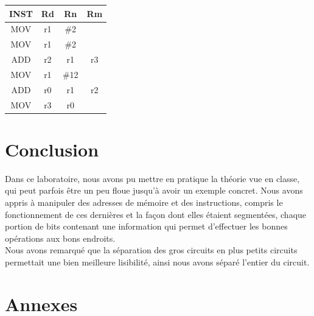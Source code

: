 \documentclass[a4paper]{article} %
\begin{document}
\begin{tabular}{|c|c|c|c|}
    
    \hline
    INST & Rd & Rn  & Rm  \\
    \hline
    MOV  & r1 & \#2  &    \\
    \hline
    MOV  & r1 & \#2  &    \\
    \hline
    ADD  & r2 & r1   & r3 \\
    \hline
    MOV  & r1 & \#12 &    \\
    \hline
    ADD  & r0 & r1   & r2 \\
    \hline
    MOV  & r3 & r0   &    \\
    \hline
\end{tabular}
    
    




\section{Conclusion}
Dans ce laboratoire, nous avons pu mettre en pratique la théorie vue en classe, qui peut parfois être un peu floue jusqu'à avoir un exemple concret. Nous avons appris à manipuler des adresses de mémoire et des instructions, compris le fonctionnement de ces dernières et la façon dont elles étaient segmentées, chaque portion de bits contenant une information qui permet d'effectuer les bonnes opérations aux bons endroits. \\
Nous avons remarqué que la séparation des gros circuits en plus petits circuits permettait une bien meilleure lisibilité, ainsi nous avons séparé l'entier du circuit.
\section{Annexes}
\end{document}
